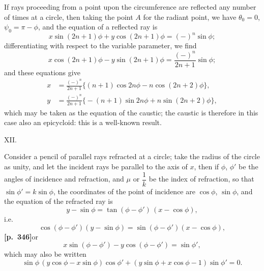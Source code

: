 \documentclass[11pt]{article}
\begin{document}
If rays proceeding from a point upon the circumference are reflected any number of times at a circle, then taking the point $A$ for the radiant point, we have $\theta_{0} = 0$, $\psi_{0} = \pi - \phi$, and the equation of a reflected ray is
\[
x\sin(2n+1)\phi + y\cos(2n+1)\phi = (-)^{n}\sin\phi;
\]
differentiating with respect to the variable parameter, we find
\[
x\cos(2n+1)\phi - y\sin(2n+1)\phi = \frac{(-)^{n}}{2n+1}\sin\phi;
\]
and these equations give
\begin{align*}
x &= \frac{(-)^{n}}{2n+1}\bigl\{(n+1)\cos 2n\phi - n\cos(2n+2)\phi\bigr\},\\
y &= \frac{(-)^{n}}{2n+1}\bigl\{-(n+1)\sin 2n\phi + n\sin(2n+2)\phi\bigr\},
\end{align*}
which may be taken as the equation of the caustic; the caustic is therefore in this case also an epicycloid: this is a well-known result.

\medskip
\begin{center}XII.\end{center}

Consider a pencil of parallel rays refracted at a circle; take the radius of the circle as unity, and let the incident rays be parallel to the axis of $x$, then if $\phi$, $\phi'$ be the angles of incidence and refraction, and $\mu$ or $\dfrac{1}{k}$ be the index of refraction, so that $\sin\phi' = k\sin\phi$, the coordinates of the point of incidence are $\cos\phi$, $\sin\phi$, and the equation of the refracted ray is
\[
y - \sin\phi = \tan(\phi-\phi')\,(x - \cos\phi),
\]
i.e.
\[
\cos(\phi-\phi')(y - \sin\phi) = \sin(\phi-\phi')(x - \cos\phi),
\]
\textbf{[p.~346]}\quad or
\[
x\sin(\phi-\phi') - y\cos(\phi-\phi') = \sin\phi',
\]
which may also be written
\[
\sin\phi\,(y\cos\phi - x\sin\phi)\cos\phi' + (y\sin\phi + x\cos\phi - 1)\sin\phi' = 0.
\]
\end{document}
